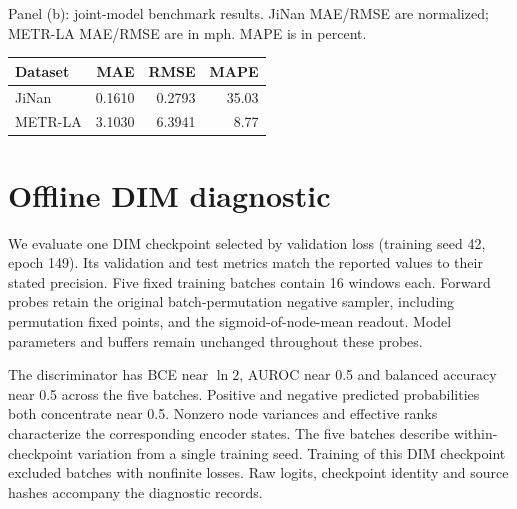 \documentclass[a4paper,10pt]{article}
\begin{document}
\begin{table}[htbp]
\noindent Panel (b): joint-model benchmark results. JiNan MAE/RMSE are normalized; METR-LA MAE/RMSE are in mph. MAPE is in percent.
\begin{center}\footnotesize
\begin{tabular}{lrrr}\toprule
Dataset & MAE & RMSE & MAPE \\ \midrule
JiNan & 0.1610 & 0.2793 & 35.03 \\
METR-LA & 3.1030 & 6.3941 & 8.77 \\
\bottomrule\end{tabular}\end{center}
\end{table}

\section{Offline DIM diagnostic}
We evaluate one DIM checkpoint selected by validation loss (training seed 42, epoch 149). Its validation and test metrics match the reported values to their stated precision. Five fixed training batches contain 16 windows each. Forward probes retain the original batch-permutation negative sampler, including permutation fixed points, and the sigmoid-of-node-mean readout. Model parameters and buffers remain unchanged throughout these probes.

The discriminator has BCE near $\ln 2$, AUROC near 0.5 and balanced accuracy near 0.5 across the five batches. Positive and negative predicted probabilities both concentrate near 0.5. Nonzero node variances and effective ranks characterize the corresponding encoder states. The five batches describe within-checkpoint variation from a single training seed. Training of this DIM checkpoint excluded batches with nonfinite losses. Raw logits, checkpoint identity and source hashes accompany the diagnostic records.
\end{document}
